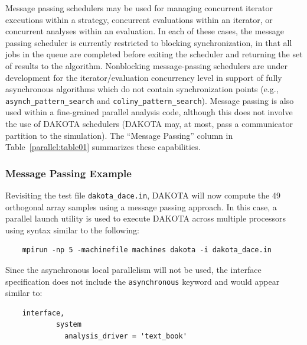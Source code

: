 Message passing schedulers may be used for managing concurrent
iterator executions within a strategy, concurrent evaluations within
an iterator, or concurrent analyses within an evaluation.  In each of
these cases, the message passing scheduler is currently restricted to
blocking synchronization, in that all jobs in the queue are completed
before exiting the scheduler and returning the set of results to the
algorithm. Nonblocking message-passing schedulers are under
development for the iterator/evaluation concurrency level in support
of fully asynchronous algorithms which do not contain synchronization
points (e.g., \texttt{asynch\_pattern\_search} and
\texttt{coliny\_pattern\_search}).  Message passing is also used within
a fine-grained parallel analysis code, although this does not involve
the use of DAKOTA schedulers (DAKOTA may, at most, pass a communicator
partition to the simulation).  The ``Message Passing'' column in
Table~\ref{parallel:table01} summarizes these capabilities.

\subsubsection{Message Passing Example}\label{parallel:SLP:message:ex}

Revisiting the test file \texttt{dakota\_dace.in}, DAKOTA will now
compute the 49 orthogonal array samples using a message passing
approach.  In this case, a parallel launch utility is used to execute
DAKOTA across multiple processors using syntax similar to the following:
\begin{small}
\begin{verbatim}
    mpirun -np 5 -machinefile machines dakota -i dakota_dace.in
\end{verbatim}
\end{small}

Since the asynchronous local parallelism will not be used, the
interface specification does not include the \texttt{asynchronous}
keyword and would appear similar to:
\begin{small}
\begin{verbatim}
    interface,
            system
              analysis_driver = 'text_book'
\end{verbatim}
\end{small}

